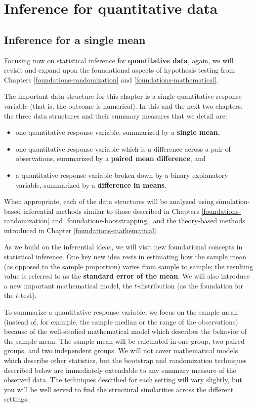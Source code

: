 \documentclass[
  10pt,
  openany]{book}
\providecommand{\tightlist}{%
  \setlength{\itemsep}{0pt}\setlength{\parskip}{0pt}}
\theoremstyle{definition}
\theoremstyle{definition}
\theoremstyle{definition}
\theoremstyle{definition}
\theoremstyle{remark}
\begin{document}
\part{Inference for quantitative data}\label{part-inference-for-quantitative-data}

\chapter{Inference for a single mean}\label{inference-one-mean}

Focusing now on statistical inference for \textbf{quantitative data}, again, we will revisit and expand upon the foundational aspects of hypothesis testing from Chapters \ref{foundations-randomization} and \ref{foundations-mathematical}.

The important data structure for this chapter is a single quantitative response variable (that is, the outcome is numerical). In this and the next two chapters, the three data structures and their summary measures that we detail are:

\begin{itemize}
\tightlist
\item
  one quantitative response variable, summarized by a \textbf{single mean},
\item
  one quantitative response variable which is a difference across a pair of observations, summarized by a \textbf{paired mean difference}, and
\item
  a quantitative response variable broken down by a binary explanatory variable, summarized by a \textbf{difference in means}.
\end{itemize}

When appropriate, each of the data structures will be analyzed using simulation-based inferential methods similar to those described in Chapters \ref{foundations-randomization} and \ref{foundations-bootstrapping}, and the theory-based methods introduced in Chapter \ref{foundations-mathematical}.

As we build on the inferential ideas, we will visit new foundational concepts in statistical inference. One key new idea rests in estimating how the sample mean (as opposed to the sample proportion) varies from sample to sample; the resulting value is referred to as the \textbf{standard error of the mean}. We will also introduce a new important mathematical model, the \(t\)-distribution (as the foundation for the \(t\)-test).

To summarize a quantitative response variable, we focus on the sample mean (instead of, for example, the sample median or the range of the observations) because of the well-studied mathematical model which describes the behavior of the sample mean.
The sample mean will be calculated in one group, two paired groups, and two independent groups. We will not cover mathematical models which describe other statistics, but the bootstrap and randomization techniques described below are immediately extendable to any summary measure of the observed data.
The techniques described for each setting will vary slightly, but you will be well served to find the structural similarities across the different settings.
\end{document}
